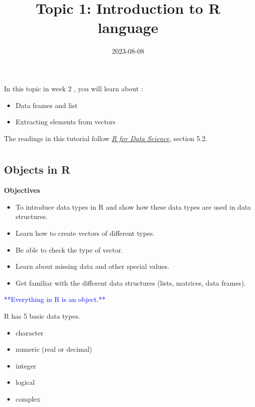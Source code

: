 \documentclass[
]{article}
\title{Topic 1: Introduction to R language}
\author{}
\date{\vspace{-2.5em}2023-08-08}
\providecommand{\tightlist}{%
  \setlength{\itemsep}{0pt}\setlength{\parskip}{0pt}}
\begin{document}
\maketitle

In this topic in week 2 , you will learn about :

\begin{itemize}
\tightlist
\item
  Data frames and list
\item
  Extracting elements from vectors
\end{itemize}

The readings in this tutorial follow
\href{http://r4ds.had.co.nz/}{\emph{R for Data Science}}, section 5.2.

\hypertarget{section}{%
\section{}\label{section}}

\hypertarget{objects-in-r}{%
\subsection{Objects in R}\label{objects-in-r}}

\textbf{Objectives}

\begin{itemize}
\tightlist
\item
  To introduce data types in R and show how these data types are used in
  data structures.
\item
  Learn how to create vectors of different types.
\item
  Be able to check the type of vector.
\item
  Learn about missing data and other special values.
\item
  Get familiar with the different data structures (lists, matrices, data
  frames).
\end{itemize}

\textcolor{blue}{**Everything in R is an object.**}

R has 5 basic data types.

\begin{itemize}
\tightlist
\item
  character
\item
  numeric (real or decimal)
\item
  integer
\item
  logical
\item
  complex
\end{itemize}
\end{document}
